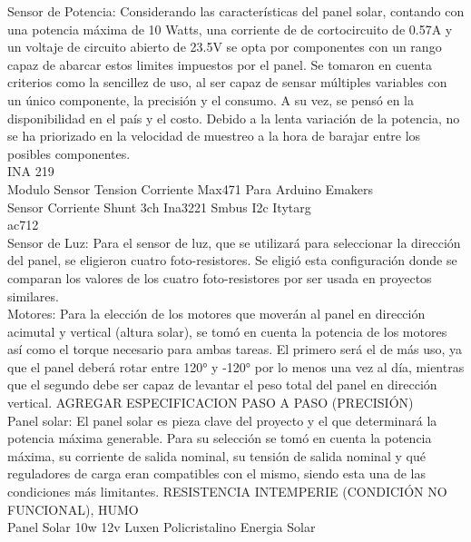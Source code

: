 \documentclass[a4paper,12pt]{article}
\begin{document}
Sensor de Potencia: 
Considerando las características del panel solar, contando con una potencia máxima de 10 Watts, una corriente de de cortocircuito de 0.57A y un voltaje de circuito abierto de 23.5V se opta por componentes con un rango capaz de abarcar estos limites impuestos por el panel. Se tomaron en cuenta criterios como la sencillez de uso, al ser capaz de sensar múltiples variables con un único componente, la precisión y el consumo. A su vez, se pensó en la disponibilidad en el país y el costo. 
Debido a la lenta variación de la potencia, no se ha priorizado en la velocidad de muestreo a la hora de barajar entre los posibles componentes.\\ 

INA 219\\
Modulo Sensor Tension Corriente Max471 Para Arduino Emakers\\
Sensor Corriente Shunt 3ch Ina3221 Smbus I2c Itytarg\\
ac712\\

Sensor de Luz:
Para el sensor de luz, que se utilizará para seleccionar la dirección del panel, se eligieron cuatro foto-resistores. Se eligió esta configuración donde se comparan los valores de los cuatro foto-resistores por ser usada en proyectos similares. \\

Motores:
Para la elección de los motores que moverán al panel en dirección acimutal y vertical (altura solar), se tomó en cuenta la potencia de los motores así como el torque necesario para ambas tareas. El primero será el de más uso, ya que el panel deberá rotar entre 120° y -120° por lo menos una vez al día, mientras que el segundo debe ser capaz de levantar el peso total del panel en dirección vertical. AGREGAR ESPECIFICACION PASO A PASO (PRECISIÓN) \\

Panel solar:
El panel solar es pieza clave del proyecto y el que determinará la potencia máxima generable. Para su selección se tomó en cuenta la potencia máxima, su corriente de salida nominal, su tensión de salida nominal y qué reguladores de carga eran compatibles con el mismo, siendo esta una de las condiciones más limitantes. RESISTENCIA INTEMPERIE (CONDICIÓN NO FUNCIONAL), HUMO\\

Panel Solar 10w 12v Luxen Policristalino Energia Solar\\
\end{document}
